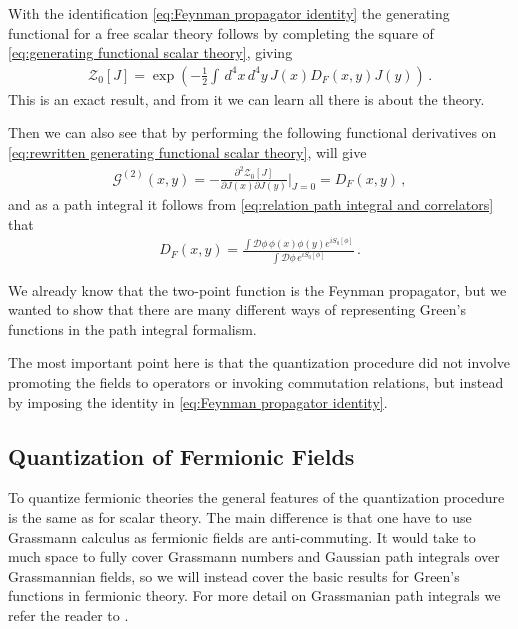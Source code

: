 With the identification \cref{eq:Feynman propagator identity} the generating functional for a free scalar theory follows by completing the square of \cref{eq:generating functional scalar theory}, giving
\begin{align}\label{eq:rewritten generating functional scalar theory}
    \mathcal{Z}_{0}[J]=\exp(-\frac{1}{2}\int\,d^{4}x\,d^{4}y\,J(x)D_{F}(x,y)J(y))\,.
\end{align}
This is an exact result, and from it we can learn all there is about the theory.

Then we can also see that by performing the following functional derivatives on \cref{eq:rewritten generating functional scalar theory}, will give
\begin{align}
    \mathcal{G}^{(2)}(x,y)=-\frac{\partial^{2}\mathcal{Z}_{0}[J]}{\partial J(x)\partial J(y)}\big|_{J=0}=D_{F}(x,y)\,,
\end{align}
and as a path integral it follows from \cref{eq:relation path integral and correlators} that
\begin{align}
    D_{F}(x,y)=\frac{\int\mathcal{D}\phi\,\phi(x)\phi(y)e^{iS_{0}[\phi]}}{\int\mathcal{D}\phi \,e^{iS_{0}[\phi]}}\,.
\end{align}

We already know that the two-point function is the Feynman propagator, but we wanted to show that there are many different ways of representing Green's functions in the path integral formalism.

The most important point here is that the quantization procedure did not involve promoting the fields to operators or invoking commutation relations, but instead by imposing the identity in \cref{eq:Feynman propagator identity}.

\subsection{Quantization of Fermionic Fields}\label{sec:quantization of fermion}
To quantize fermionic theories the general features of the quantization procedure is the same as for scalar theory. The main difference is that one have to use Grassmann calculus as fermionic fields are anti-commuting. It would take to much space to fully cover Grassmann numbers and Gaussian path integrals over Grassmannian fields, so we will instead cover the basic results for Green's functions in fermionic theory. For more detail on Grassmanian path integrals we refer the reader to \cite{Peskin:257493}.

